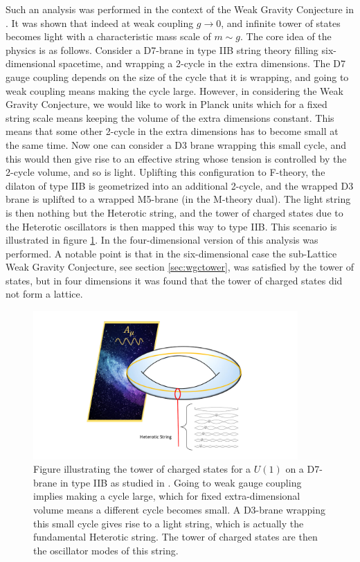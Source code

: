 \documentclass[11pt,a4paper]{article}
\numberwithin{equation}{section}
\numberwithin{table}{section}\setlength{\multlinegap}{25pt}
\begin{document}
Such an analysis was performed in the context of the Weak Gravity Conjecture in \cite{Lee:2018urn,Lee:2018spm,Lee:2019tst}. It was shown that indeed at weak coupling $g \rightarrow 0$, and infinite tower of states becomes light with a characteristic mass scale of $m \sim g$. The core idea of the physics is as follows. Consider a D7-brane in type IIB string theory filling six-dimensional spacetime, and wrapping a 2-cycle in the extra dimensions. The D7 gauge coupling depends on the size of the cycle that it is wrapping, and going to weak coupling means making the cycle large. However, in considering the Weak Gravity Conjecture, we would like to work in Planck units which for a fixed string scale means keeping the volume of the extra dimensions constant. This means that some other 2-cycle in the extra dimensions has to become small at the same time. Now one can consider a D3 brane wrapping this small cycle, and this would then give rise to an effective string whose tension is controlled by the 2-cycle volume, and so is light. Uplifting this configuration to F-theory, the dilaton of type IIB is geometrized into an additional 2-cycle, and the wrapped D3 brane is uplifted to a wrapped M5-brane (in the M-theory dual). The light string is then nothing but the Heterotic string, and the tower of charged states due to the Heterotic oscillators is then mapped this way to type IIB. This scenario is illustrated in figure \ref{fig:ftheory}. In \cite{Lee:2019tst} the four-dimensional version of this analysis was performed. A notable point is that in the six-dimensional case the sub-Lattice Weak Gravity Conjecture, see section \ref{sec:wgctower}, was satisfied by the tower of states, but in four dimensions it was found that the tower of charged states did not form a lattice.
\begin{figure}[t]
\centering
 \includegraphics[width=0.9\textwidth]{ftheory.pdf}
\caption{Figure illustrating the tower of charged states for a $U(1)$ on a D7-brane in type IIB as studied in \cite{Lee:2018urn,Lee:2018spm,Lee:2019tst}. Going to weak gauge coupling implies making a cycle large, which for fixed extra-dimensional volume means a different cycle becomes small. A D3-brane wrapping this small cycle gives rise to a light string, which is actually the fundamental Heterotic string. The tower of charged states are then the oscillator modes of this string.}
\label{fig:ftheory}
\end{figure}
\end{document}
